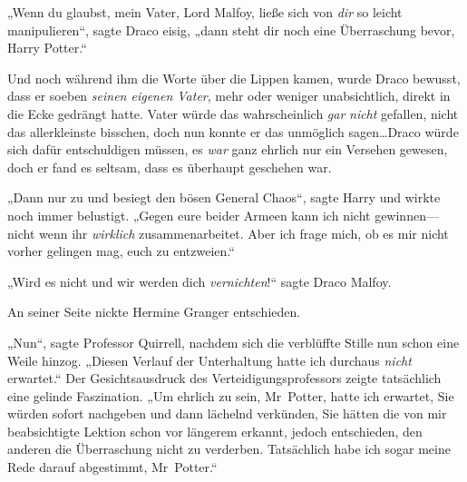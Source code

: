 „Wenn du glaubst, mein Vater, Lord Malfoy, ließe sich von \emph{dir} so leicht manipulieren“, sagte Draco eisig, „dann steht dir noch eine Überraschung bevor, Harry Potter.“

Und noch während ihm die Worte über die Lippen kamen, wurde Draco bewusst, dass er soeben \emph{seinen eigenen Vater}, mehr oder weniger unabsichtlich, direkt in die Ecke gedrängt hatte. Vater würde das wahrscheinlich \emph{gar} \emph{nicht} gefallen, nicht das allerkleinste bisschen, doch nun konnte er das unmöglich sagen…Draco würde sich dafür entschuldigen müssen, es \emph{war} ganz ehrlich nur ein Versehen gewesen, doch er fand es seltsam, dass es überhaupt geschehen war.

„Dann nur zu und besiegt den bösen General Chaos“, sagte Harry und wirkte noch immer belustigt. „Gegen eure beider Armeen kann ich nicht gewinnen—nicht wenn ihr \emph{wirklich} zusammenarbeitet. Aber ich frage mich, ob es mir nicht vorher gelingen mag, euch zu entzweien.“

„Wird es nicht und wir werden dich \emph{vernichten}!“ sagte Draco Malfoy.

An seiner Seite nickte Hermine Granger entschieden.

„Nun“, sagte Professor Quirrell, nachdem sich die verblüffte Stille nun schon eine Weile hinzog. „Diesen Verlauf der Unterhaltung hatte ich durchaus \emph{nicht} erwartet.“ Der Gesichtsausdruck des Verteidigungsprofessors zeigte tatsächlich eine gelinde Faszination. „Um ehrlich zu sein, Mr~Potter, hatte ich erwartet, Sie würden sofort nachgeben und dann lächelnd verkünden, Sie hätten die von mir beabsichtigte Lektion schon vor längerem erkannt, jedoch entschieden, den anderen die Überraschung nicht zu verderben. Tatsächlich habe ich sogar meine Rede darauf abgestimmt, Mr~Potter.“

